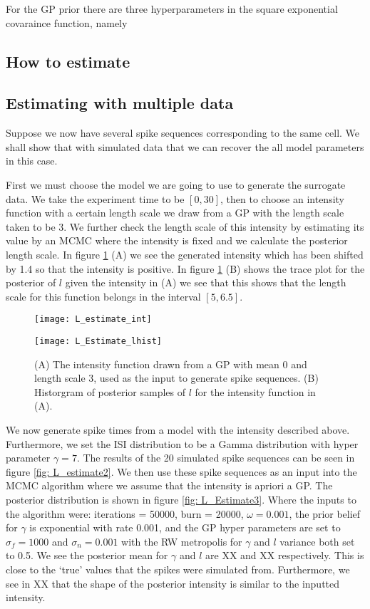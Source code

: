 \documentclass[../main.tex]{subfiles}
\begin{document}
For the GP prior there are three hyperparameters in the square exponential covaraince function, namely 
\subsection{How to estimate}
\subsection{Estimating with multiple data}
Suppose we now have several spike sequences corresponding to the same cell. We shall show that with simulated data that we can recover the all model parameters in this case. 

First we must choose the model we are going to use to generate the surrogate data. We take the experiment time to be $[0,30]$, then to choose an intensity function with a certain length scale we draw from a GP with the length scale taken to be 3. We further check the length scale of this intensity by estimating its value by an MCMC where the intensity is fixed and we calculate the posterior length scale. In figure \ref{fig: L_Estimate1} (A) we see the generated intensity which has been shifted by 1.4 so that the intensity is positive. In figure \ref{fig: L_Estimate1} (B) shows the trace plot for the posterior of $l$ given the intensity in (A) we see that this shows that the length scale for this function belongs in the interval $[5, 6.5]$. 

\begin{figure}
	\begin{subfloat}[]{
	\texttt{[image: L\_estimate\_int]}}
	\end{subfloat}
	\begin{subfloat}[]{
	\texttt{[image: L\_Estimate\_lhist]}}
	\end{subfloat}	
		\caption{(A) The intensity function drawn from a GP with mean 0 and length scale 3, used as the input to generate spike sequences. (B) Historgram of posterior samples of $l$ for the intensity function in (A). }
\label{fig: L_Estimate1}
\end{figure}

We now generate spike times from a model with the intensity described above. Furthermore, we set the ISI distribution to be a Gamma distribution with hyper parameter $\gamma = 7$. The results of the 20 simulated spike sequences can be seen in figure \ref{fig: L_estimate2}. We then use these spike sequences as an input into the MCMC algorithm where we assume that the intensity is apriori a GP. The posterior distribution is shown in figure \ref{fig: L_Estimate3}. Where the inputs to the algorithm were: iterations = 50000, burn = 20000, $\omega = 0.001$, the prior belief for $\gamma$ is exponential with rate 0.001, and the GP hyper parameters are set to $\sigma_f = 1000$ and $\sigma_n = 0.001$ with the RW metropolis for $\gamma$ and $l$ variance both set to 0.5. We see the posterior mean for $\gamma$ and $l$ are XX and XX respectively. This is close to the `true' values that the spikes were simulated from. Furthermore, we see in XX that the shape of the posterior intensity is similar to the inputted intensity. %
\end{document}
